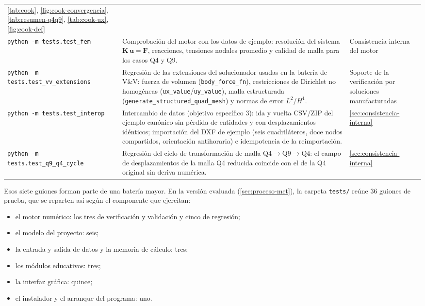 {\begin{longtable}{@{}>{\footnotesize\raggedright\arraybackslash}p{4.3cm} >{\footnotesize\raggedright\arraybackslash}p{5.1cm} >{\footnotesize\raggedright\arraybackslash}p{4.1cm}@{}}
\autoref{tab:cook}, \autoref{fig:cook-convergencia}, \autoref{tab:resumen-q4q9}, \autoref{tab:cook-ux}, \autoref{fig:cook-def} \\
\addlinespace
\texttt{python -m tests.test\_fem} &
Comprobación del motor con los datos de ejemplo: resolución del sistema $\bm{K}\,\bm{u}=\bm{F}$, reacciones, tensiones nodales promedio y calidad de malla para los casos Q4 y Q9. &
Consistencia interna del motor \\
\addlinespace
\texttt{python -m tests.test\_vv\_extensions} &
Regresión de las extensiones del solucionador usadas en la batería de V\&V: fuerza de volumen (\texttt{body\_force\_fn}), restricciones de Dirichlet no homogéneas (\texttt{ux\_value}/\texttt{uy\_value}), malla estructurada (\texttt{generate\_structured\_quad\_mesh}) y normas de error $L^2$/$H^1$. &
Soporte de la verificación por soluciones manufacturadas \\
\addlinespace
\texttt{python -m tests.test\_interop} &
Intercambio de datos (objetivo específico 3): ida y vuelta CSV/ZIP del ejemplo canónico sin pérdida de entidades y con desplazamientos idénticos; importación del DXF de ejemplo (seis cuadriláteros, doce nodos compartidos, orientación antihoraria) e idempotencia de la reimportación. &
\autoref{sec:consistencia-interna} \\
\addlinespace
\texttt{python -m tests.test\_q9\_q4\_cycle} &
Regresión del ciclo de transformación de malla $\text{Q4}\rightarrow\text{Q9}\rightarrow\text{Q4}$: el campo de desplazamientos de la malla Q4 reducida coincide con el de la Q4 original sin deriva numérica. &
\autoref{sec:consistencia-interna} \\
\end{longtable}}

Esos siete guiones forman parte de una batería mayor. En la versión evaluada (\autoref{sec:proceso-met}), la carpeta \texttt{tests/} reúne 36 guiones de prueba, que se reparten así según el componente que ejercitan:

\begin{itemize}
    \item el motor numérico: los tres de verificación y validación y cinco de regresión;
    \item el modelo del proyecto: seis;
    \item la entrada y salida de datos y la memoria de cálculo: tres;
    \item los módulos educativos: tres;
    \item la interfaz gráfica: quince;
    \item el instalador y el arranque del programa: uno.
\end{itemize}

